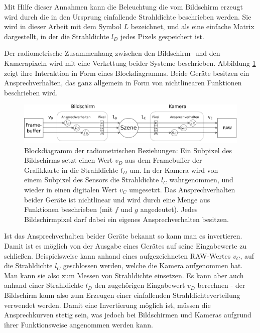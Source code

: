  
    Mit Hilfe dieser Annahmen kann die Beleuchtung die vom Bildschirm erzeugt wird durch die in den Ursprung einfallende Strahldichte beschrieben werden.
    Sie wird in dieser Arbeit mit dem Symbol $L$ bezeichnet, und als eine einfache Matrix dargestellt, in der die Strahldichte $l_D$ jedes Pixels gespeichert ist.

    Der radiometrische Zusammenhang zwischen den Bildschirm- und den Kamerapixeln wird mit eine Verkettung beider Systeme beschrieben.
    Abbildung \ref{fig:radiometric_pipeline} zeigt ihre Interaktion in Form eines Blockdiagramms.
    Beide Geräte besitzen ein Ansprechverhalten, das ganz allgemein in Form von nichtlinearen Funktionen beschrieben wird.
 
   \begin{figure}[h]
    \centering
    \includegraphics[width=\textwidth]{../graphics/kalibrierung/radiometric_pipeline.svg}
    \caption[Blockdiagramm der radiometrischen Beziehungen]{ 
     Blockdiagramm der radiometrischen Beziehungen: Ein Subpixel des Bildschirms setzt einen Wert $v_D$ aus dem Framebuffer der Grafikkarte in die Strahldichte $l_D$ um.
     In der Kamera wird von einem Subpixel des Sensors die Strahldichte $l_C$ wahrgenommen, und wieder in einen digitalen Wert $v_C$ umgesetzt. 
     Das Ansprechverhalten beider Geräte ist nichtlinear und wird durch eine Menge aus Funktionen beschrieben (mit $f$ und $g$ angedeutet).
     Jedes Bildschirmpixel darf dabei ein eigenes Ansprechverhalten besitzen.}
    \label{fig:radiometric_pipeline}
   \end{figure}
  
  Ist das Ansprechverhalten beider Geräte bekannt so kann man es invertieren.
  Damit ist es möglich von der Ausgabe eines Gerätes auf seine Eingabewerte zu schließen.
  Beispielsweise kann anhand eines aufgezeichneten RAW-Wertes $v_C$, auf die Strahldichte $l_C$ geschlossen werden, welche die Kamera aufgenommen hat. Man kann sie also zum Messen von Strahldichte einsetzen.
  Es kann aber auch anhand einer Strahldichte $l_D$ den zugehörigen Eingabewert $v_D$ berechnen - der Bildschirm kann also zum Erzeugen einer einfallenden Strahldichteverteilung verwendet werden.
  Damit eine Invertierung möglich ist, müssen die Ansprechkurven stetig sein, was jedoch bei Bildschirmen und Kameras aufgrund ihrer Funktionsweise angenommen werden kann.
   
